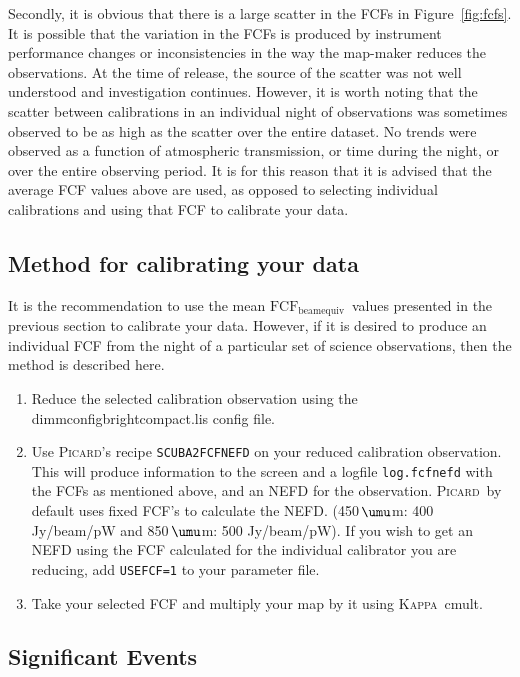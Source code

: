 \documentclass[twoside,11pt]{article}
\newcommand{\micron}{\mbox{\,${\umu}$m}}            %
\newcommand{\xref}[3]{#1}
\newcommand{\xlabel}[1]{}
\renewcommand{\_}{\texttt{\symbol{95}}}
\newcommand{\fcfbe}{$\mathrm{FCF_{beamequiv}}$}
\newcommand{\Kappa}{\xref{\textsc{Kappa}}{sun95}{}}
\newcommand{\picard}{\xref{\textsc{Picard}}{sun231}{}}
\newcommand{\drrecipe}[1]{\texttt{#1}}
\newcommand{\task}[1]{\textsf{#1}}
\newcommand{\cmult}{\xref{\task{cmult}}{sun95}{CMULT}}
\begin{document}
Secondly, it is obvious that there is a large scatter in the FCFs in
Figure~\ref{fig:fcfs}. It is possible that the variation in the FCFs
is produced by instrument performance changes or inconsistencies in
the way the map-maker reduces the observations. At the time of
release, the source of the scatter was not well understood and
investigation continues. However, it is worth noting that the scatter
between calibrations in an individual night of observations was
sometimes observed to be as high as the scatter over the entire
dataset. No trends were observed as a function of atmospheric
transmission, or time during the night, or over the entire observing
period. It is for this reason that it is advised that the average FCF
values above are used, as opposed to selecting individual calibrations
and using that FCF to calibrate your data.

\subsection{Method for calibrating your data}


It is the recommendation to use the mean \fcfbe\ values
presented in the previous section to calibrate your data. However, if
it is desired to produce an individual FCF from the night of a
particular set of science observations, then the method is described
here.

\begin{enumerate}
\item{Reduce the selected calibration observation using the
dimmconfig\_bright\_compact.lis config file.}
\item{Use \picard's recipe \drrecipe{SCUBA2\_FCFNEFD} on your reduced calibration
    observation. This will produce information to the screen and a
    logfile \texttt{log.fcfnefd} with the FCFs as mentioned above, and an NEFD
    for the observation. \picard\ by default uses fixed FCF's to
    calculate the NEFD. (450\micron: 400 Jy/beam/pW and 850\micron: 500
    Jy/beam/pW). If you wish to get an NEFD using the FCF calculated
    for the individual calibrator you are reducing, add \texttt{USEFCF=1} to
    your parameter file. }
\item{Take your selected FCF and multiply your map by it using \Kappa\
    \cmult.}
\end{enumerate}

\subsection{\xlabel{sroevents}Significant Events}
\end{document}
